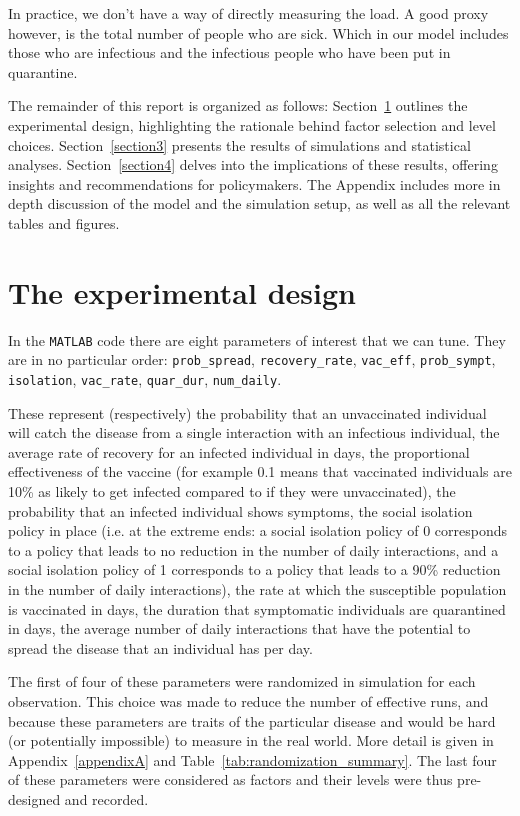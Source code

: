 \documentclass[12pt,a4paper]{article}
\begin{document}
In practice, we don't have a way of directly measuring the load. A good proxy however, is the total number of people who are sick. Which in our model includes those who are infectious and the infectious people who have been put in quarantine.

The remainder of this report is organized as follows: Section~\ref{section2} outlines the experimental design, highlighting the rationale behind factor selection and level choices. Section~\ref{section3} presents the results of simulations and statistical analyses. Section~\ref{section4} delves into the implications of these results, offering insights and  recommendations for policymakers. The Appendix includes more in depth discussion of the model and the simulation setup, as well as all the relevant tables and figures.

\section{The experimental design}\label{section2}

In the \verb`MATLAB` code there are eight parameters of interest that we can tune. They are in no particular order:  \verb`prob_spread`, \verb`recovery_rate`, \verb`vac_eff`, \verb`prob_sympt`,  \verb`isolation`,  \verb`vac_rate`, \verb`quar_dur`, \verb`num_daily`.

These represent (respectively) the probability that an unvaccinated individual will catch the disease from a single interaction with an infectious individual, the average rate of recovery for an infected individual in days, the proportional effectiveness of the vaccine (for example 0.1 means that vaccinated individuals are 10\% as likely to get infected compared to if they were unvaccinated), the probability that an infected individual shows symptoms, the social isolation policy in place (i.e. at the extreme ends: a social isolation policy of 0 corresponds to a policy that leads to no reduction in the number of daily interactions, and a social isolation policy of 1 corresponds to a policy that leads to a 90\% reduction in the number of daily interactions), the rate at which the susceptible population is vaccinated in days, the duration that symptomatic individuals are quarantined in days, the average number of daily interactions that have the potential to spread the disease that an individual has per day. 

The first of four of these parameters were randomized in simulation for each observation. This choice was made to reduce the number of effective runs, and because these parameters are traits of the particular disease and would be hard (or potentially impossible) to measure in the real world. More detail is given in Appendix~\ref{appendixA} and Table~\ref{tab:randomization_summary}. The last four of these parameters were considered as factors and their levels were thus pre-designed and recorded. 
\end{document}
